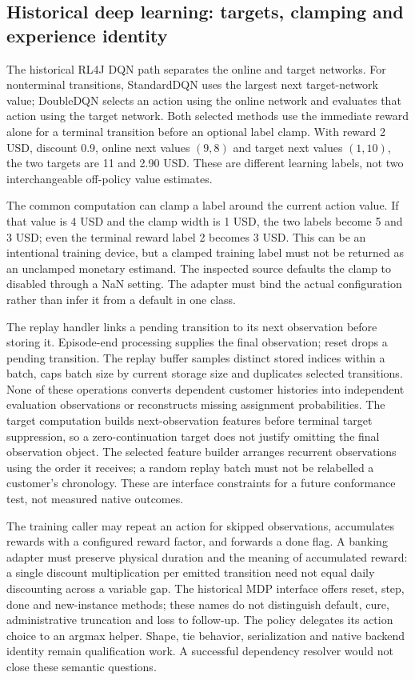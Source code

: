 \subsection{Historical deep learning: targets, clamping and experience identity}
The historical RL4J DQN path separates the online and target networks. For nonterminal transitions, StandardDQN uses the largest next target-network value; DoubleDQN selects an action using the online network and evaluates that action using the target network. Both selected methods use the immediate reward alone for a terminal transition before an optional label clamp. With reward 2 USD, discount 0.9, online next values $(9,8)$ and target next values $(1,10)$, the two targets are 11 and 2.90 USD. These are different learning labels, not two interchangeable off-policy value estimates.\citep{exec24_policyjava_rl4j,exec24_policyjava_comparison}

The common computation can clamp a label around the current action value. If that value is 4 USD and the clamp width is 1 USD, the two labels become 5 and 3 USD; even the terminal reward label 2 becomes 3 USD. This can be an intentional training device, but a clamped training label must not be returned as an unclamped monetary estimand. The inspected source defaults the clamp to disabled through a NaN setting. The adapter must bind the actual configuration rather than infer it from a default in one class.\citep{exec24_policyjava_rl4j,exec24_policyjava_comparison}

The replay handler links a pending transition to its next observation before storing it. Episode-end processing supplies the final observation; reset drops a pending transition. The replay buffer samples distinct stored indices within a batch, caps batch size by current storage size and duplicates selected transitions. None of these operations converts dependent customer histories into independent evaluation observations or reconstructs missing assignment probabilities. The target computation builds next-observation features before terminal target suppression, so a zero-continuation target does not justify omitting the final observation object. The selected feature builder arranges recurrent observations using the order it receives; a random replay batch must not be relabelled a customer's chronology. These are interface constraints for a future conformance test, not measured native outcomes.\citep{exec24_policyjava_rl4j}

The training caller may repeat an action for skipped observations, accumulates rewards with a configured reward factor, and forwards a done flag. A banking adapter must preserve physical duration and the meaning of accumulated reward: a single discount multiplication per emitted transition need not equal daily discounting across a variable gap. The historical MDP interface offers reset, step, done and new-instance methods; these names do not distinguish default, cure, administrative truncation and loss to follow-up. The policy delegates its action choice to an argmax helper. Shape, tie behavior, serialization and native backend identity remain qualification work. A successful dependency resolver would not close these semantic questions.\citep{exec24_policyjava_rl4j}

